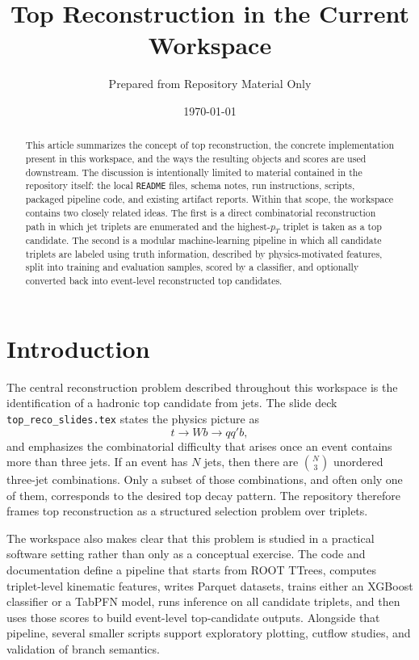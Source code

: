 \documentclass[11pt]{article}
\title{Top Reconstruction in the Current Workspace}
\author{Prepared from Repository Material Only}
\date{\today}
\begin{document}
\maketitle

\begin{abstract}
This article summarizes the concept of top reconstruction, the concrete implementation present in this workspace, and the ways the resulting objects and scores are used downstream. The discussion is intentionally limited to material contained in the repository itself: the local \texttt{README} files, schema notes, run instructions, scripts, packaged pipeline code, and existing artifact reports. Within that scope, the workspace contains two closely related ideas. The first is a direct combinatorial reconstruction path in which jet triplets are enumerated and the highest-$p_T$ triplet is taken as a top candidate. The second is a modular machine-learning pipeline in which all candidate triplets are labeled using truth information, described by physics-motivated features, split into training and evaluation samples, scored by a classifier, and optionally converted back into event-level reconstructed top candidates.
\end{abstract}

\section{Introduction}

The central reconstruction problem described throughout this workspace is the identification of a hadronic top candidate from jets. The slide deck \texttt{top\_reco\_slides.tex} states the physics picture as
\[
t \to Wb \to qq'b,
\]
and emphasizes the combinatorial difficulty that arises once an event contains more than three jets. If an event has $N$ jets, then there are $\binom{N}{3}$ unordered three-jet combinations. Only a subset of those combinations, and often only one of them, corresponds to the desired top decay pattern. The repository therefore frames top reconstruction as a structured selection problem over triplets.

The workspace also makes clear that this problem is studied in a practical software setting rather than only as a conceptual exercise. The code and documentation define a pipeline that starts from ROOT TTrees, computes triplet-level kinematic features, writes Parquet datasets, trains either an XGBoost classifier or a TabPFN model, runs inference on all candidate triplets, and then uses those scores to build event-level top-candidate outputs. Alongside that pipeline, several smaller scripts support exploratory plotting, cutflow studies, and validation of branch semantics.
\end{document}
